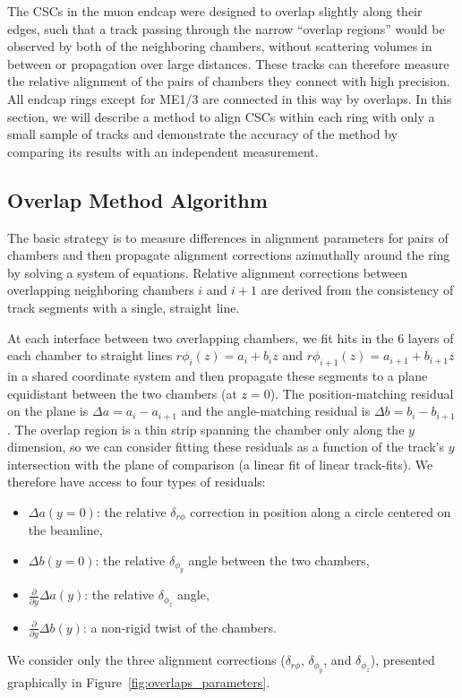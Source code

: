 The CSCs in the muon endcap were designed to overlap slightly along
their edges, such that a track passing through the narrow ``overlap
regions'' would be observed by both of the neighboring chambers,
without scattering volumes in between or propagation over large
distances.  These tracks can therefore measure the relative alignment
of the pairs of chambers they connect with high precision.  All endcap
rings except for ME1/3 are connected in this way by overlaps.  In this
section, we will describe a method to align CSCs within each ring with
only a small sample of tracks and demonstrate the accuracy of the
method by comparing its results with an independent measurement.

\subsection{Overlap Method Algorithm} 

The basic strategy is to measure differences in alignment parameters
for pairs of chambers and then propagate alignment corrections azimuthally around
the ring by solving a system of equations.  Relative alignment
corrections between overlapping neighboring chambers $i$ and $i+1$ are derived
from the consistency of track segments with a single, straight line.

At each interface between two overlapping chambers, we fit hits in the 6 layers of
each chamber to straight lines $r\phi_i(z) = a_i + b_i z$ and
$r\phi_{i+1}(z) = a_{i+1} + b_{i+1} z$ in a shared coordinate system
and then propagate these segments to a plane equidistant between the
two chambers (at $z=0$).  The position-matching residual on the
plane is $\Delta a = a_i - a_{i+1}$ and the angle-matching residual
is $\Delta b = b_i - b_{i+1}$.  The overlap region is a thin strip
spanning the chamber only along the $y$ dimension, so we can consider
fitting these residuals as a function of the track's $y$ intersection
with the plane of comparison (a linear fit of linear track-fits).
We therefore have access to four types of residuals:
\begin{itemize}
\item $\Delta a(y=0)$: the relative $\delta_{r\phi}$
correction in position along a circle centered on the beamline,
\item $\Delta b(y=0)$: the relative $\delta_{\phi_y}$
angle between the two chambers,
\item $\frac{\partial}{\partial y} \Delta a(y)$: the relative $\delta_{\phi_z}$ angle,
\item $\frac{\partial}{\partial y} \Delta b(y)$: a non-rigid twist of the chambers.
\end{itemize}
We consider only the three alignment corrections ($\delta_{r\phi}$,
$\delta_{\phi_y}$, and $\delta_{\phi_z}$), presented graphically in
Figure~\ref{fig:overlaps_parameters}.

